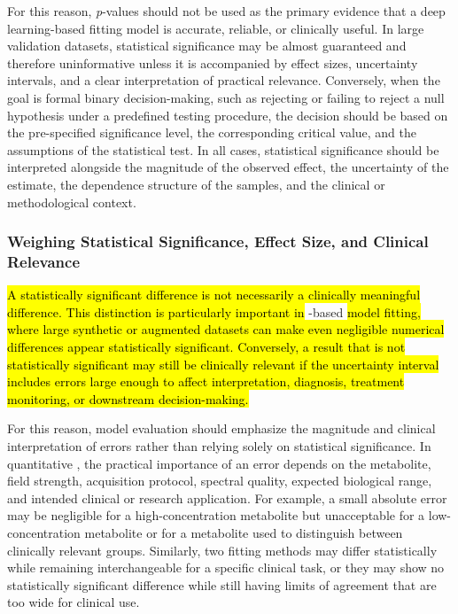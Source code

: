 For this reason, \textit{p}-values should not be used as the primary evidence that a deep learning-based fitting model is accurate, reliable, or clinically useful. In large validation datasets, statistical significance may be almost guaranteed and therefore uninformative unless it is accompanied by effect sizes, uncertainty intervals, and a clear interpretation of practical relevance. Conversely, when the goal is formal binary decision-making, such as rejecting or failing to reject a null hypothesis under a predefined testing procedure, the decision should be based on the pre-specified significance level, the corresponding critical value, and the assumptions of the statistical test. In all cases, statistical significance should be interpreted alongside the magnitude of the observed effect, the uncertainty of the estimate, the dependence structure of the samples, and the clinical or methodological context.

\subsubsection{Weighing Statistical Significance, Effect Size, and Clinical Relevance}
\hl{A statistically significant difference is not necessarily a clinically meaningful difference. This distinction is particularly important in} \DL-based \MRS \hl{model fitting, where large synthetic or augmented datasets can make even negligible numerical differences appear statistically significant. Conversely, a result that is not statistically significant may still be clinically relevant if the uncertainty interval includes errors large enough to affect interpretation, diagnosis, treatment monitoring, or downstream decision-making.} 

For this reason, model evaluation should emphasize the magnitude and clinical interpretation of errors rather than relying solely on statistical significance. In quantitative \MRS, the practical importance of an error depends on the metabolite, field strength, acquisition protocol, spectral quality, expected biological range, and intended clinical or research application. For example, a small absolute error may be negligible for a high-concentration metabolite but unacceptable for a low-concentration metabolite or for a metabolite used to distinguish between clinically relevant groups. Similarly, two fitting methods may differ statistically while remaining interchangeable for a specific clinical task, or they may show no statistically significant difference while still having limits of agreement that are too wide for clinical use.

